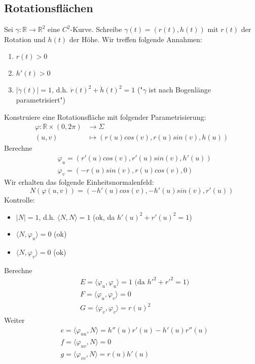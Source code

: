 \documentclass[../main.tex]{subfiles}
\begin{document}
\subsection*{Rotationsflächen}
Sei $\gamma:\mathbb{R}\to\mathbb{R}^{2}$ eine $C^{2}$-Kurve. Schreibe $\gamma(t) = (r(t),h(t))$ mit $r(t)$ der Rotation und $h(t)$ der Höhe. Wir treffen folgende Annahmen:
\begin{enumerate}
    \item $r(t)>0$
    \item $h'(t)>0$
    \item $\lvert\dot{\gamma}(t)\rvert = 1$, d.h. $\dot{r}(t)^{2}+\dot{h}(t)^{2} = 1$ ("$\gamma$ ist nach Bogenlänge parametrisiert")
\end{enumerate}
Konstruiere eine Rotationsfläche mit folgender Parametrisierung:\begin{align*}
    \varphi:\mathbb{R}\times(0,2\pi) &\to \Sigma\\
    (u,v) &\mapsto (r(u)cos(v), r(u)sin(v),h(u))
\end{align*}
Berechne \begin{align*}
    &\varphi_{u} = (r'(u)cos(v), r'(u)sin(v),h'(u))\\
    &\varphi_{v} = (-r(u)sin(v), r(u)cos(v), 0)
\end{align*}
Wir erhalten das folgende Einheitsnormalenfeld:
$$ N(\varphi(u,v)) = (-h'(u)cos(v), -h'(u)sin(v), r'(u))$$
Kontrolle:
\begin{itemize}
    \item $\lvert N\rvert = 1$, d.h. $\langle N,N\rangle = 1$ (ok, da $h'(u)^{2}+r'(u)^{2}=1$)
    \item $\langle N,\varphi_{u}\rangle = 0$ (ok)
    \item $\langle N,\varphi_{v}\rangle = 0$ (ok)
\end{itemize}
Berechne \begin{align*}
    &E = \langle\varphi_{u},\varphi_{u}\rangle = 1 \text{ (da } h'^{2}+r'^{2}=1)\\
    &F = \langle\varphi_{u},\varphi_{v}\rangle = 0\\
    &G = \langle\varphi_{v},\varphi_{v}\rangle = r(u)^{2}
\end{align*}
Weiter \begin{align*}
    &e = \langle\varphi_{uu},N\rangle = h''(u)r'(u)-h'(u)r''(u)\\
    &f = \langle\varphi_{uv},N\rangle = 0\\
    &g = \langle\varphi_{vv},N\rangle = r(u)h'(u)
\end{align*}
\end{document}
